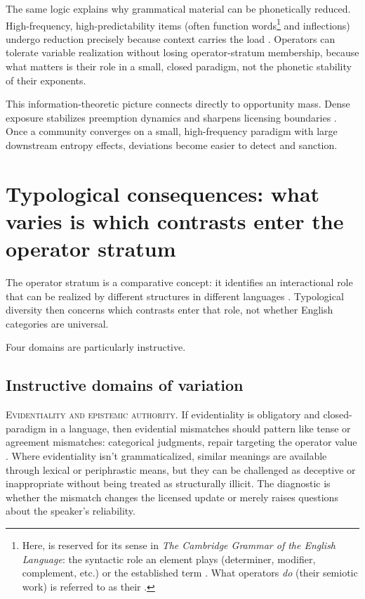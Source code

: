 \documentclass[12pt,letterpaper]{article}
\begin{document}
The same logic explains why grammatical material can be phonetically reduced. High-frequency, high-predictability items (often function words\footnote{Here,  is reserved for its sense in \textit{The Cambridge Grammar of the English Language}: the syntactic role an element plays (determiner, modifier, complement, etc.) or the established term . What operators \emph{do} (their semiotic work) is referred to as their .} and inflections) undergo reduction precisely because context carries the load \citep{jaeger2010}. Operators can tolerate variable realization without losing operator-stratum membership, because what matters is their role in a small, closed paradigm, not the phonetic stability of their exponents.

This information-theoretic picture connects directly to opportunity mass. Dense exposure stabilizes preemption dynamics and sharpens licensing boundaries \citep{bybee2006,bybee2010}. Once a community converges on a small, high-frequency paradigm with large downstream entropy effects, deviations become easier to detect and sanction.

\section{Typological consequences: what varies is which contrasts enter the operator stratum}

The operator stratum is a comparative concept: it identifies an interactional role that can be realized by different structures in different languages \citep{haspelmath2007}. Typological diversity then concerns which contrasts enter that role, not whether English categories are universal.

Four domains are particularly instructive.

\subsection{Instructive domains of variation}

\textsc{Evidentiality and epistemic authority.} If evidentiality is obligatory and closed-paradigm in a language, then evidential mismatches should pattern like tense or agreement mismatches: categorical judgments, repair targeting the operator value \citep{aikhenvald2004}. Where evidentiality isn't grammaticalized, similar meanings are available through lexical or periphrastic means, but they can be challenged as deceptive or inappropriate without being treated as structurally illicit. The diagnostic is whether the mismatch changes the licensed update or merely raises questions about the speaker's reliability.
\end{document}
